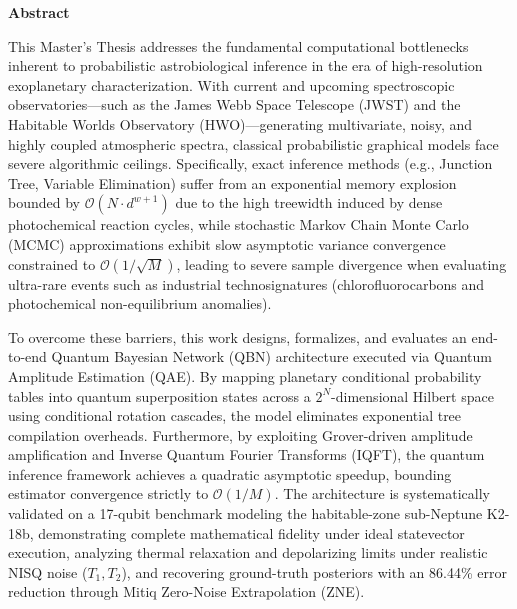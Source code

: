 {\centering\Large\bfseries\color{nebrijared}Abstract\par}
\fontsize{11}{13}\selectfont
\vspace{\baselineskip}
This Master's Thesis addresses the fundamental computational bottlenecks inherent to probabilistic astrobiological inference in the era of high-resolution exoplanetary characterization. With current and upcoming spectroscopic observatories---such as the James Webb Space Telescope (JWST) and the Habitable Worlds Observatory (HWO)---generating multivariate, noisy, and highly coupled atmospheric spectra, classical probabilistic graphical models face severe algorithmic ceilings. Specifically, exact inference methods (e.g., Junction Tree, Variable Elimination) suffer from an exponential memory explosion bounded by $\mathcal{O}(N \cdot d^{w+1})$ due to the high treewidth induced by dense photochemical reaction cycles, while stochastic Markov Chain Monte Carlo (MCMC) approximations exhibit slow asymptotic variance convergence constrained to $\mathcal{O}(1/\sqrt{M})$, leading to severe sample divergence when evaluating ultra-rare events such as industrial technosignatures (chlorofluorocarbons and photochemical non-equilibrium anomalies).

\vspace{\baselineskip}

To overcome these barriers, this work designs, formalizes, and evaluates an end-to-end Quantum Bayesian Network (QBN) architecture executed via Quantum Amplitude Estimation (QAE). By mapping planetary conditional probability tables into quantum superposition states across a $2^N$-dimensional Hilbert space using conditional rotation cascades, the model eliminates exponential tree compilation overheads. Furthermore, by exploiting Grover-driven amplitude amplification and Inverse Quantum Fourier Transforms (IQFT), the quantum inference framework achieves a quadratic asymptotic speedup, bounding estimator convergence strictly to $\mathcal{O}(1/M)$. The architecture is systematically validated on a 17-qubit benchmark modeling the habitable-zone sub-Neptune K2-18b, demonstrating complete mathematical fidelity under ideal statevector execution, analyzing thermal relaxation and depolarizing limits under realistic NISQ noise ($T_1, T_2$), and recovering ground-truth posteriors with an 86.44\% error reduction through Mitiq Zero-Noise Extrapolation (ZNE).
